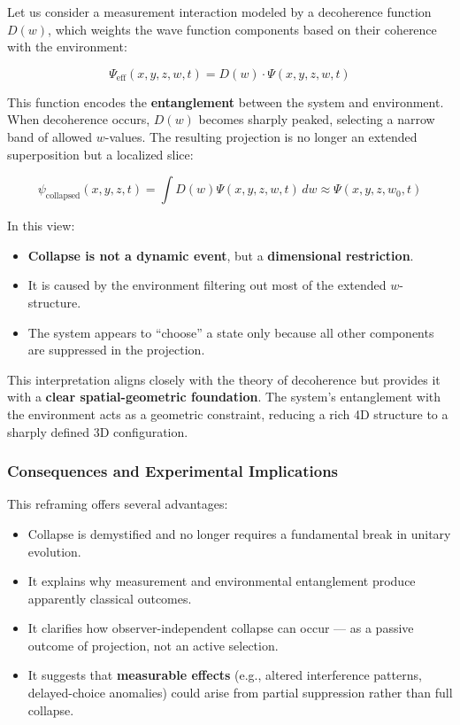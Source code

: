 \documentclass[12pt]{article}
\begin{document}
Let us consider a measurement interaction modeled by a decoherence function \( D(w) \), which weights the wave function components based on their coherence with the environment:

\begin{equation}
\Psi_{\text{eff}}(x, y, z, w, t) = D(w) \cdot \Psi(x, y, z, w, t)
\end{equation}

This function encodes the \textbf{entanglement} between the system and environment. When decoherence occurs, \( D(w) \) becomes sharply peaked, selecting a narrow band of allowed \( w \)-values. The resulting projection is no longer an extended superposition but a localized slice:


\begin{equation}
\psi_{\text{collapsed}}(x, y, z, t) = \int D(w) \Psi(x, y, z, w, t) \, dw \approx \Psi(x, y, z, w_0, t)
\end{equation}

In this view:

\begin{itemize}
 \item \textbf{Collapse is not a dynamic event}, but a \textbf{dimensional restriction}.
  \item It is caused by the environment filtering out most of the extended \( w \)-structure.
  \item The system appears to “choose” a state only because all other components are suppressed in the projection.
\end{itemize}

This interpretation aligns closely with the theory of decoherence but provides it with a \textbf{clear spatial-geometric foundation}. The system's entanglement with the environment acts as a geometric constraint, reducing a rich 4D structure to a sharply defined 3D configuration.


\subsubsection{Consequences and Experimental Implications}

This reframing offers several advantages:

\begin{itemize}
  \item Collapse is demystified and no longer requires a fundamental break in unitary evolution.
  \item It explains why measurement and environmental entanglement produce apparently classical outcomes.
  \item It clarifies how observer-independent collapse can occur — as a passive outcome of projection, not an active selection.
  \item It suggests that \textbf{measurable effects} (e.g., altered interference patterns, delayed-choice anomalies) could arise from partial suppression rather than full collapse.

\end{itemize}
\end{document}
